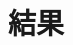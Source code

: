 \documentclass[../main.tex]{subfiles}
\begin{document}
\section{結果}
\label{sec:results}
\end{document}
